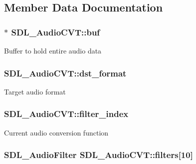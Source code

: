 \subsection{Member Data Documentation}
\hypertarget{struct_s_d_l___audio_c_v_t_a080db27b929efa983c5161360ffce310}{
\subsubsection[{buf}]{$\ast$ S\-D\-L\-\_\-\-Audio\-C\-V\-T\-::buf}}\label{struct_s_d_l___audio_c_v_t_a080db27b929efa983c5161360ffce310}
Buffer to hold entire audio data \hypertarget{struct_s_d_l___audio_c_v_t_a8f890d017be857a3b048bf00525736c6}{
\subsubsection[{dst\-\_\-format}]{ S\-D\-L\-\_\-\-Audio\-C\-V\-T\-::dst\-\_\-format}}\label{struct_s_d_l___audio_c_v_t_a8f890d017be857a3b048bf00525736c6}
Target audio format \hypertarget{struct_s_d_l___audio_c_v_t_a35093b3ad3331c17416c593a76012b63}{
\subsubsection[{filter\-\_\-index}]{ S\-D\-L\-\_\-\-Audio\-C\-V\-T\-::filter\-\_\-index}}\label{struct_s_d_l___audio_c_v_t_a35093b3ad3331c17416c593a76012b63}
Current audio conversion function \hypertarget{struct_s_d_l___audio_c_v_t_aeec0ebddc5e142bbafcc94a6014ad23e}{
\subsubsection[{filters}]{\setlength{\rightskip}{0pt plus 5cm}S\-D\-L\-\_\-\-Audio\-Filter S\-D\-L\-\_\-\-Audio\-C\-V\-T\-::filters\mbox{[}10\mbox{]}}}\label{struct_s_d_l___audio_c_v_t_aeec0ebddc5e142bbafcc94a6014ad23e}
